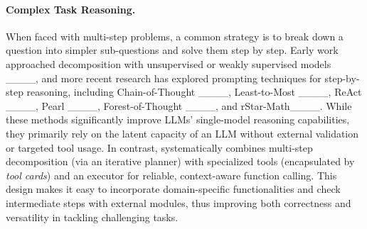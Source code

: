 \paragraph{Complex Task Reasoning.}
When faced with multi-step problems, a common strategy is to break down a question into simpler sub-questions and solve them step by step. Early work approached decomposition with unsupervised or weakly supervised models ____, and more recent research has explored prompting techniques for step-by-step reasoning, including Chain-of-Thought ____, Least-to-Most ____, ReAct ____, Pearl ____, Forest-of-Thought ____, and rStar-Math____. While these methods significantly improve LLMs’ single-model reasoning capabilities, they primarily rely on the latent capacity of an LLM without external validation or targeted tool usage. In contrast, \model systematically combines multi-step decomposition (via an iterative planner) with specialized tools (encapsulated by \emph{tool cards}) and an executor for reliable, context-aware function calling. This design makes it easy to incorporate domain-specific functionalities and check intermediate steps with external modules, thus improving both correctness and versatility in tackling challenging tasks.